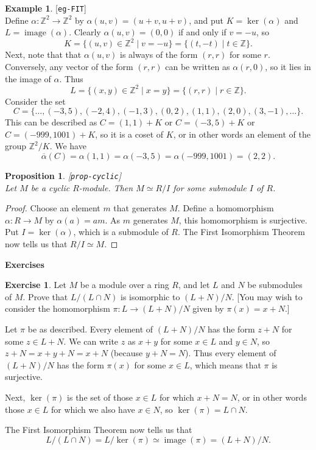 \documentclass{amsart}
\newcommand{\lbl}[1]{\label{#1}\textup{[\texttt{#1}]}\ \\}
\newcommand{\lbl}{\label}
\newcommand{\img}       {\operatorname{image}}
\newcommand{\Z}         {{\mathbb{Z}}}
\newcommand{\al}        {\alpha}
\newcommand{\alb}       {\overline{\alpha}}
\newcommand{\xra}       {\xrightarrow}
\newcommand{\st}        {\;|\;}
\newcommand{\ip}[1]     {\langle #1\rangle}
\renewcommand{\:}{\colon}
\newtheorem{proposition}[theorem]{Proposition}
\theoremstyle{definition}
\newtheorem{example}[theorem]{Example}
\newtheorem{exercise}{Exercise}[section]
\renewenvironment{solution}{\SolutionAtEnd}{\endSolutionAtEnd}
\begin{document}
\begin{example}\lbl{eg-FIT}
 Define $\al\:\Z^2\xra{}\Z^2$ by $\al(u,v)=(u+v,u+v)$, and put
 $K=\ker(\al)$ and $L=\img(\al)$.  Clearly $\al(u,v)=(0,0)$ if and
 only if $v=-u$, so 
 \[ K = \{(u,v)\in \Z^2\st v=-u\} = \{(t,-t)\st t\in\Z\}. \]
 Next, note that that $\al(u,v)$ is always of the form $(r,r)$ for
 some $r$.  Conversely, any vector of the form $(r,r)$ can be written
 as $\al(r,0)$, so it lies in the image of $\al$.  Thus
 \[ L = \{(x,y)\in\Z^2\st x=y\} = \{(r,r)\st r\in \Z\}. \]
 Consider the set 
 \[ C = 
  \{ \ldots,(-3,5),(-2,4),(-1,3),(0,2),(1,1),(2,0),(3,-1),\ldots\}.
 \]
 This can be described as $C=(1,1)+K$ or $C=(-3,5)+K$ or
 $C=(-999,1001)+K$, so it is a coset of $K$, or in other words an
 element of the group $\Z^2/K$.  We have 
 \[ \alb(C) = \al(1,1) = \al(-3,5) = \al(-999,1001) = (2,2). \]
\end{example}

\begin{proposition}\lbl{prop-cyclic}
 Let $M$ be a cyclic $R$-module.  Then $M\simeq R/I$ for some
 submodule $I$ of $R$.
\end{proposition}
\begin{proof}
 Choose an element $m$ that generates $M$.  Define a homomorphism
 $\al\:R\xra{}M$ by $\al(a)=am$.  As $m$ generates $M$, this
 homomorphism is surjective.  Put $I=\ker(\al)$, which is a submodule
 of $R$.  The First Isomorphism Theorem now tells us that
 $R/I\simeq M$. 
\end{proof}


\begin{center}
 \Large \textbf{Exercises}
\end{center}

\begin{exercise}
 Let $M$ be a module over a ring $R$, and let $L$ and $N$ be
 submodules of $M$.  Prove that $L/(L\cap N)$ is isomorphic to
 $(L+N)/N$.  [You may wish to consider the homomorphism
 $\pi\:L\xra{}(L+N)/N$ given by $\pi(x)=x+N$.]
\end{exercise}
\begin{solution}
 Let $\pi$ be as described.  Every element of $(L+N)/N$ has the form
 $z+N$ for some $z\in L+N$.  We can write $z$ as $x+y$ for some
 $x\in L$ and $y\in N$, so $z+N=x+y+N=x+N$ (because $y+N=N$).  Thus
 every element of $(L+N)/N$ has the form $\pi(x)$ for some $x\in L$,
 which means that $\pi$ is surjective.

 Next, $\ker(\pi)$ is the set of those $x\in L$ for which $x+N=N$, or
 in other words those $x\in L$ for which we also have $x\in N$, so
 $\ker(\pi)=L\cap N$.  

 The First Isomorphism Theorem now tells us that 
 \[ L/(L\cap N)=L/\ker(\pi)\simeq \img(\pi) = (L+N)/N. \]
\end{solution}
\end{document}
